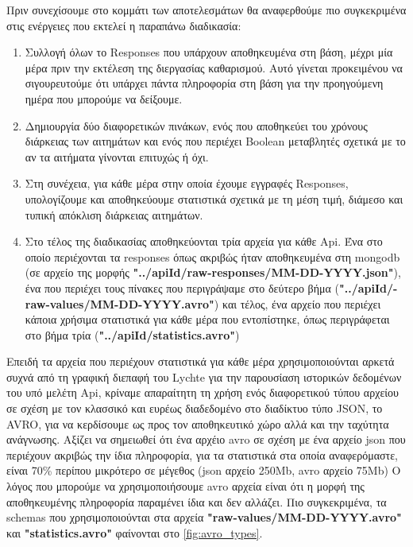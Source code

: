 Πριν συνεχίσουμε στο κομμάτι των αποτελεσμάτων θα αναφερθούμε πιο συγκεκριμένα στις
ενέργειες που εκτελεί η παραπάνω διαδικασία:

\begin{enumerate}
	\item Συλλογή όλων το Responses που υπάρχουν αποθηκευμένα στη βάση, μέχρι μία μέρα πριν την εκτέλεση της διεργασίας καθαρισμού. Αυτό γίνεται προκειμένου να σιγουρευτούμε ότι υπάρχει πάντα πληροφορία στη βάση για την προηγούμενη ημέρα που μπορούμε να δείξουμε.
	\item Δημιουργία δύο διαφορετικών πινάκων, ενός που αποθηκεύει του χρόνους διάρκειας των αιτημάτων και ενός που περιέχει Boolean μεταβλητές σχετικά με το αν τα αιτήματα γίνονται επιτυχώς ή όχι.
	\item Στη συνέχεια, για κάθε μέρα στην οποία έχουμε εγγραφές Responses, υπολογίζουμε και αποθηκεύουμε στατιστικά σχετικά με τη μέση τιμή, διάμεσο και τυπική απόκλιση διάρκειας αιτημάτων.
	\item Στο τέλος της διαδικασίας αποθηκεύονται τρία αρχεία για κάθε Api. Ένα στο οποίο περιέχονται τα responses όπως ακριβώς ήταν αποθηκευμένα στη mongodb (σε αρχείο της μορφής \textbf{"../apiId/raw-responses/MM-DD-YYYY.json"}),
		ένα που περιέχει τους πίνακες που περιγράψαμε στο δεύτερο βήμα (\textbf{"../apiId/\hyp{}raw-values/MM-DD-YYYY.avro"}) και τέλος, ένα αρχείο που περιέχει κάποια χρήσιμα στατιστικά για κάθε μέρα που εντοπίστηκε, όπως περιγράφεται στο βήμα τρία (\textbf{"../apiId/statistics.avro"}) 
\end{enumerate}

Επειδή τα αρχεία που περιέχουν στατιστικά για κάθε μέρα χρησιμοποιούνται αρκετά συχνά από τη γραφική διεπαφή του Lychte για την παρουσίαση ιστορικών δεδομένων του υπό μελέτη Api, κρίναμε απαραίτητη τη χρήση ενός διαφορετικού τύπου αρχείου σε σχέση με
τον κλασσικό και ευρέως διαδεδομένο στο διαδίκτυο τύπο JSON, το AVRO, για να κερδίσουμε ως προς τον αποθηκευτικό χώρο αλλά και την ταχύτητα ανάγνωσης. Αξίζει να σημειωθεί ότι ένα αρχέιο avro σε σχέση με ένα αρχείο json που περιέχουν ακριβώς την ίδια
πληροφορία, για τα στατιστικά στα οποία αναφερόμαστε, είναι 70\% περίπου μικρότερο σε μέγεθος (json αρχείο 250Μb, avro αρχείο 75Μb)
Ο λόγος που μπορούμε να χρησιμοποιήσουμε avro αρχεία είναι ότι η μορφή της αποθηκευμένης πληροφορία παραμένει ίδια και δεν αλλάζει. Πιο συγκεκριμένα, τα schemas που χρησιμοποιούνται στα αρχεία \textbf{"raw-values/MM-DD-YYYY.avro"} και \textbf{"statistics.avro"}
φαίνονται στο \autoref{fig:avro_types}.


